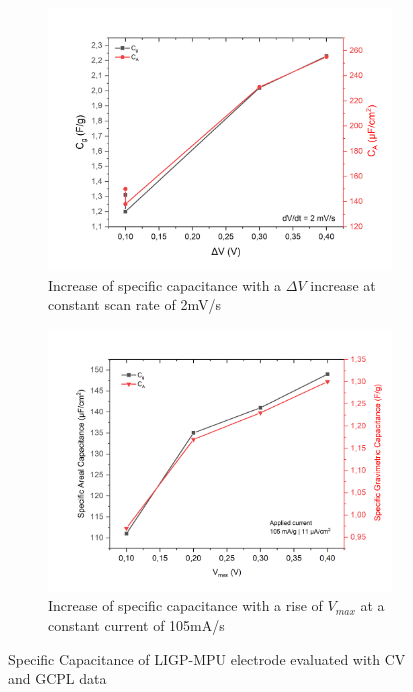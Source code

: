 \begin{figure}[H]
\begin{subfigure}{0.49\textwidth}
\includegraphics[width=1\textwidth]{Figures/Results/Electrochemistry/LIGP-MPU-NaNO3-Swagelok/Cell1/Capac-Sweep.jpg} 
\captionsetup{width=0.9\linewidth}
\caption{Increase of specific capacitance with a $\Delta V$ increase at constant scan rate of 2\:mV/s}
\label{fig:LIGP-MPU-cell1-C-CV-increase}
\end{subfigure}
\begin{subfigure}{0.49\textwidth}
\includegraphics[width=1\textwidth]{Figures/Results/Electrochemistry/LIGP-MPU-NaNO3-Swagelok/Cell1/Capac-Vmax.jpg}
\captionsetup{width=0.9\linewidth}
\caption{Increase of specific capacitance with a rise of $V_{max}$ at a constant current of  105\:mA/s}
\label{fig:LIGP-MPU-cell1-C-CC-increase}
\end{subfigure}
\medskip
\caption{Specific Capacitance of LIGP-MPU electrode evaluated with CV and GCPL data}
\label{fig:LIGP-MPU-cell1-C-increase}
\end{figure}

